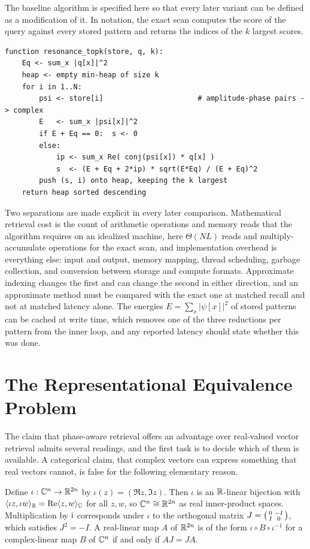 The baseline algorithm is specified here so that every later variant can be defined as a modification of it. In notation, the exact scan computes the score of the query against every stored pattern and returns the indices of the $k$ largest scores.

\begin{Verbatim}[fontsize=\small,frame=single,framesep=2mm]
function resonance_topk(store, q, k):
    Eq <- sum_x |q[x]|^2
    heap <- empty min-heap of size k
    for i in 1..N:
        psi <- store[i]                      # amplitude-phase pairs -> complex
        E   <- sum_x |psi[x]|^2
        if E + Eq == 0:  s <- 0
        else:
            ip <- sum_x Re( conj(psi[x]) * q[x] )
            s  <- (E + Eq + 2*ip) * sqrt(E*Eq) / (E + Eq)^2
        push (s, i) onto heap, keeping the k largest
    return heap sorted descending
\end{Verbatim}

Two separations are made explicit in every later comparison. Mathematical retrieval cost is the count of arithmetic operations and memory reads that the algorithm requires on an idealized machine, here $\Theta(NL)$ reads and multiply-accumulate operations for the exact scan, and implementation overhead is everything else: input and output, memory mapping, thread scheduling, garbage collection, and conversion between storage and compute formats. Approximate indexing changes the first and can change the second in either direction, and an approximate method must be compared with the exact one at matched recall and not at matched latency alone. The energies $E=\sum_x|\psi[x]|^2$ of stored patterns can be cached at write time, which removes one of the three reductions per pattern from the inner loop, and any reported latency should state whether this was done.

\chapter{The Representational Equivalence Problem}\label{ch:equiv}

The claim that phase-aware retrieval offers an advantage over real-valued vector retrieval admits several readings, and the first task is to decide which of them is available. A categorical claim, that complex vectors can express something that real vectors cannot, is false for the following elementary reason.

\begin{theorem}[Realification]\label{thm:realif}
Define $\iota:\mathbb{C}^n\to\mathbb{R}^{2n}$ by $\iota(z)=(\Re z,\Im z)$. Then $\iota$ is an $\mathbb{R}$-linear bijection with $\langle \iota z,\iota w\rangle_{\mathbb{R}}=\operatorname{Re}\langle z,w\rangle_{\mathbb{C}}$ for all $z,w$, so $\mathbb{C}^n\cong\mathbb{R}^{2n}$ as real inner-product spaces. Multiplication by $\mathrm{i}$ corresponds under $\iota$ to the orthogonal matrix $J=\begin{psmallmatrix}0&-I\\ I&0\end{psmallmatrix}$, which satisfies $J^2=-I$. A real-linear map $A$ of $\mathbb{R}^{2n}$ is of the form $\iota\circ B\circ\iota^{-1}$ for a complex-linear map $B$ of $\mathbb{C}^n$ if and only if $AJ=JA$.
\end{theorem}


